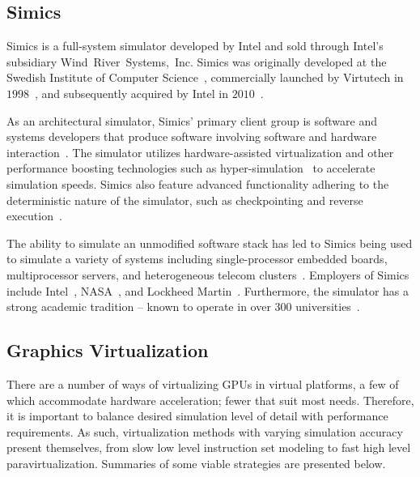 \subsection{Simics}
\label{sec:simics}
Simics is a full-system simulator developed by Intel and sold through Intel's subsidiary Wind~River~Systems,~Inc.
Simics was originally developed at the Swedish Institute of Computer Science~, commercially launched by Virtutech in $1998$~, and subsequently acquired by Intel in $2010$~.

As an architectural simulator, Simics' primary client group is software and systems developers that produce software involving software and hardware interaction~.
The simulator utilizes hardware-assisted virtualization and other performance boosting technologies such as hyper-simulation~ to accelerate simulation speeds.
Simics also feature advanced functionality adhering to the deterministic nature of the simulator, such as checkpointing and reverse execution~.

The ability to simulate an unmodified software stack has led to Simics being used to simulate a variety of systems including single-processor embedded boards, multiprocessor servers, and heterogeneous telecom clusters~.
Employers of Simics include Intel~, NASA~, and Lockheed Martin~.
Furthermore, the simulator has a strong academic tradition -- known to operate in over $300$ universities~.

\subsection{Graphics Virtualization}
\label{sec:previousresearch_graphicsvirtualization}
There are a number of ways of virtualizing GPUs in virtual platforms, a few of which accommodate hardware acceleration; fewer that suit most needs.
Therefore, it is important to balance desired simulation level of detail with performance requirements.
As such, virtualization methods with varying simulation accuracy present themselves, from slow low level instruction set modeling to fast high level paravirtualization.
Summaries of some viable strategies are presented below.

